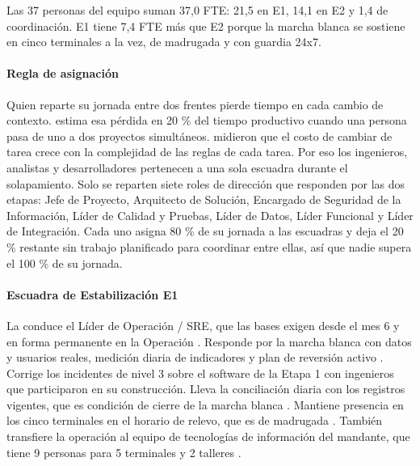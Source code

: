 Las 37 personas del equipo suman 37,0 FTE: 21,5 en E1, 14,1 en E2 y 1,4 de coordinación. E1 tiene
7,4 FTE más que E2 porque la marcha blanca se sostiene en cinco terminales a la vez, de madrugada y
con guardia 24x7.

\paragraph{Regla de asignación}
Quien reparte su jornada entre dos frentes pierde tiempo en cada cambio de contexto.
\textcite{weinberg1992} estima esa pérdida en 20 \% del tiempo productivo cuando una persona pasa de
uno a dos proyectos simultáneos. \textcite{rubinstein2001} midieron que el costo de cambiar de tarea
crece con la complejidad de las reglas de cada tarea. Por eso los ingenieros, analistas y
desarrolladores pertenecen a una sola escuadra durante el solapamiento. Solo se reparten siete roles
de dirección que responden por las dos etapas: Jefe de Proyecto, Arquitecto de Solución, Encargado de
Seguridad de la Información, Líder de Calidad y Pruebas, Líder de Datos, Líder Funcional y Líder de
Integración. Cada uno asigna 80 \% de su jornada a las escuadras y deja el 20 \% restante sin trabajo
planificado para coordinar entre ellas, así que nadie supera el 100 \% de su jornada.


\paragraph{Escuadra de Estabilización E1}
La conduce el Líder de Operación / SRE, que las bases exigen desde el mes 6 y en forma permanente en
la Operación . Responde por la marcha blanca con datos y usuarios reales,
medición diaria de indicadores y plan de reversión activo . Corrige los incidentes de
nivel 3 sobre el software de la Etapa 1 con ingenieros que participaron en su construcción. Lleva la
conciliación diaria con los registros vigentes, que es condición de cierre de la marcha blanca
. Mantiene presencia en los cinco terminales en el horario de relevo, que es de
madrugada . También transfiere la operación al equipo de tecnologías de información
del mandante, que tiene 9 personas para 5 terminales y 2 talleres .

